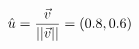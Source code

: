 \documentclass[preview]{standalone}
\begin{document}
\begin{align*}
\special{dvisvgm:raw <g id='unique000'>}\hat{u} = \frac{\vec{v}}{||\vec{v}||} = (0.8, 0.6)\special{dvisvgm:raw </g>}
\end{align*}
\end{document}
